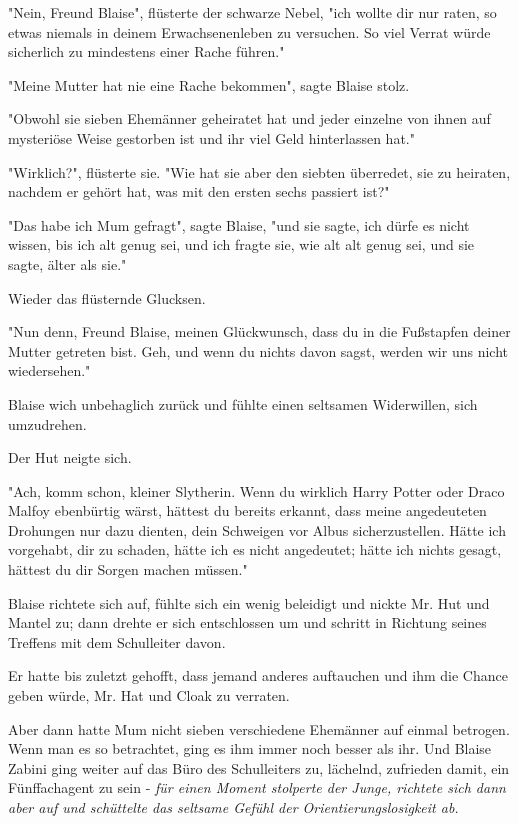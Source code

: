 {"Nein, Freund Blaise", flüsterte der schwarze Nebel, "ich wollte dir nur raten, so etwas niemals in deinem Erwachsenenleben zu versuchen. So viel Verrat würde sicherlich zu mindestens einer Rache führen."

"Meine Mutter hat nie eine Rache bekommen", sagte Blaise stolz.

"Obwohl sie sieben Ehemänner geheiratet hat und jeder einzelne von ihnen auf mysteriöse Weise gestorben ist und ihr viel Geld hinterlassen hat."

"Wirklich?", flüsterte sie. "Wie hat sie aber den siebten überredet, sie zu heiraten, nachdem er gehört hat, was mit den ersten sechs passiert ist?"

"Das habe ich Mum gefragt", sagte Blaise, "und sie sagte, ich dürfe es nicht wissen, bis ich alt genug sei, und ich fragte sie, wie alt alt genug sei, und sie sagte, älter als sie."

Wieder das flüsternde Glucksen.

"Nun denn, Freund Blaise, meinen Glückwunsch, dass du in die Fußstapfen deiner Mutter getreten bist. Geh, und wenn du nichts davon sagst, werden wir uns nicht wiedersehen."

Blaise wich unbehaglich zurück und fühlte einen seltsamen Widerwillen, sich umzudrehen.

Der Hut neigte sich.

"Ach, komm schon, kleiner Slytherin. Wenn du wirklich Harry Potter oder Draco Malfoy ebenbürtig wärst, hättest du bereits erkannt, dass meine angedeuteten Drohungen nur dazu dienten, dein Schweigen vor Albus sicherzustellen. Hätte ich vorgehabt, dir zu schaden, hätte ich es nicht angedeutet; hätte ich nichts gesagt, hättest du dir Sorgen machen müssen."

Blaise richtete sich auf, fühlte sich ein wenig beleidigt und nickte Mr. Hut und Mantel zu; dann drehte er sich entschlossen um und schritt in Richtung seines Treffens mit dem Schulleiter davon.

Er hatte bis zuletzt gehofft, dass jemand anderes auftauchen und ihm die Chance geben würde, Mr. Hat und Cloak zu verraten.

Aber dann hatte Mum nicht sieben verschiedene Ehemänner auf einmal betrogen. Wenn man es so betrachtet, ging es ihm immer noch besser als ihr. Und Blaise Zabini ging weiter auf das Büro des Schulleiters zu, lächelnd, zufrieden damit, ein Fünffachagent zu sein - \emph{für einen Moment stolperte der Junge, richtete sich dann aber auf und schüttelte das seltsame Gefühl der Orientierungslosigkeit ab.}

}
